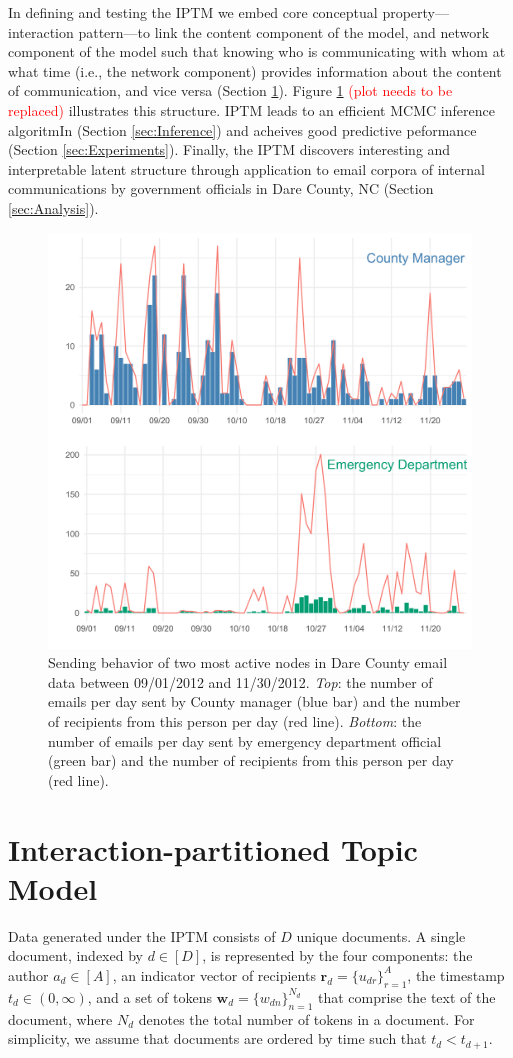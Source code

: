 \documentclass{article}
\begin{document}
In defining and testing the IPTM we embed core conceptual property---interaction pattern---to link the content component of the model, and network component of the model such that knowing who is communicating with whom at what time (i.e., the network component) provides information about the content of communication, and vice versa (Section \ref{sec:model definition}). Figure \ref{fig:EDAplot} \textcolor{red}{(plot needs to be replaced)} illustrates this structure. IPTM leads to an efficient MCMC inference algoritmIn (Section \ref{sec:Inference}) and acheives good predictive peformance (Section \ref{sec:Experiments}). Finally, the IPTM discovers interesting and interpretable latent structure through application to email corpora of internal communications by government officials in Dare County, NC (Section \ref{sec:Analysis}). 
\begin{figure}[t]
	\centering
	\includegraphics[width=.48\textwidth]{plots/EDAplot.png}  
	\caption{Sending behavior of two most active nodes in Dare County email data between 09/01/2012 and 11/30/2012. \textit{Top}: the number of emails per day sent by County manager (blue bar) and the number of recipients from this person per day (red line). \textit{Bottom}: the number of emails per day sent by emergency department official (green bar) and the number of recipients from this person per day (red line).}
\label{fig:EDAplot}
\vskip -0.15in
\end{figure}
\section{Interaction-partitioned Topic Model}\label{sec:model definition}

Data generated under the IPTM consists of $D$ unique documents. A single document, indexed by $d \in [D]$, is represented by the four components: the author $a_d \in [A]$, an indicator vector of recipients $\boldsymbol{r}_d = \{u_{dr} \}_{r=1}^{A}$, the timestamp $t_d \in (0, \infty)$, and a set of tokens $\boldsymbol{w}_d= \{w_{dn} \}_{n=1}^{N_d}$ that comprise the text of the document, where $N_d$ denotes the total number of tokens in a document. For simplicity, we assume that documents are ordered by time such that $t_d < t_{d+1}$.
\end{document}
